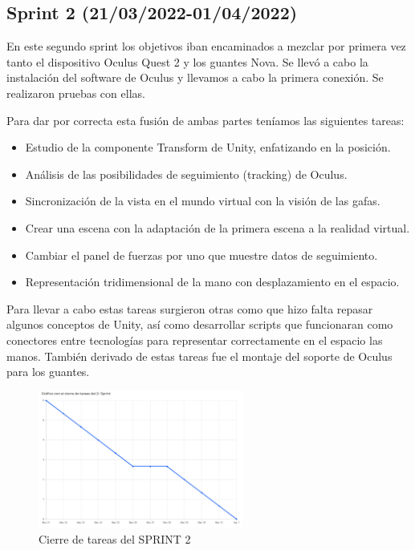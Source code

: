 \subsection{\textbf{Sprint 2 (21/03/2022-01/04/2022)}}
En este segundo sprint los objetivos iban encaminados a mezclar por primera vez tanto el dispositivo Oculus Quest 2\cite{Quest2} y los guantes Nova. Se llevó a cabo la instalación del software de Oculus y llevamos a cabo la primera conexión. Se realizaron pruebas con ellas.

Para dar por correcta esta fusión de ambas partes teníamos las siguientes tareas:
\begin{itemize}
    \item Estudio de la componente\cite{Componentes} Transform de Unity, enfatizando en la posición.
    \item Análisis de las posibilidades de seguimiento (tracking) de Oculus.
    \item Sincronización de la vista en el mundo virtual con la visión de las gafas.
    \item Crear una escena con la adaptación de la primera escena a la realidad virtual.
    \item Cambiar el panel de fuerzas por uno que muestre datos de seguimiento.
    \item Representación tridimensional de la mano con desplazamiento en el espacio.
\end{itemize}
Para llevar a cabo estas tareas surgieron otras como que hizo falta repasar algunos conceptos de Unity, así como desarrollar scripts que funcionaran como conectores entre tecnologías para representar correctamente en el espacio las manos. También derivado de estas tareas fue el montaje del soporte de Oculus para los guantes.

\begin{figure}[h]
\centering
\label{Cierre de tareas del SPRINT 2}
\includegraphics[width=0.6\textwidth]{img/sprint2.PNG}
\caption{Cierre de tareas del SPRINT 2}
\end{figure}
